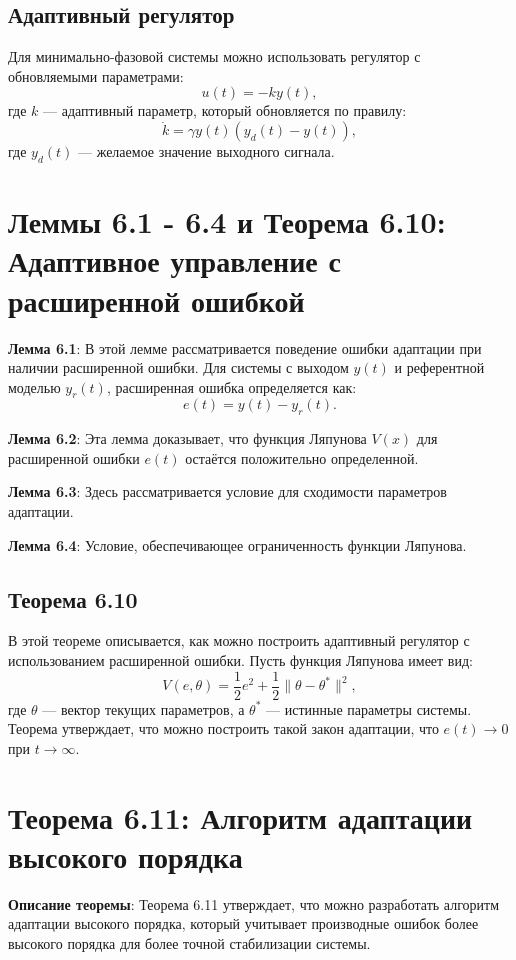 \documentclass[a4paper,14pt]{extarticle} %
\begin{document}
\subsection*{Адаптивный регулятор}
Для минимально-фазовой системы можно использовать регулятор с обновляемыми параметрами:
\[
u(t) = -k y(t),
\]
где \( k \) — адаптивный параметр, который обновляется по правилу:
\[
\dot{k} = \gamma y(t) \left( y_d(t) - y(t) \right),
\]
где \( y_d(t) \) — желаемое значение выходного сигнала.

\section{Леммы 6.1 - 6.4 и Теорема 6.10: Адаптивное управление с расширенной ошибкой}
\textbf{Лемма 6.1}: В этой лемме рассматривается поведение ошибки адаптации при наличии расширенной ошибки. Для системы с выходом \( y(t) \) и референтной моделью \( y_r(t) \), расширенная ошибка определяется как:
\[
e(t) = y(t) - y_r(t).
\]

\textbf{Лемма 6.2}: Эта лемма доказывает, что функция Ляпунова \( V(x) \) для расширенной ошибки \( e(t) \) остаётся положительно определенной.

\textbf{Лемма 6.3}: Здесь рассматривается условие для сходимости параметров адаптации.

\textbf{Лемма 6.4}: Условие, обеспечивающее ограниченность функции Ляпунова.

\subsection*{Теорема 6.10}
В этой теореме описывается, как можно построить адаптивный регулятор с использованием расширенной ошибки. Пусть функция Ляпунова имеет вид:
\[
V(e, \theta) = \frac{1}{2} e^2 + \frac{1}{2} \| \theta - \theta^* \|^2,
\]
где \( \theta \) — вектор текущих параметров, а \( \theta^* \) — истинные параметры системы. Теорема утверждает, что можно построить такой закон адаптации, что \( e(t) \to 0 \) при \( t \to \infty \).

\section{Теорема 6.11: Алгоритм адаптации высокого порядка}
\textbf{Описание теоремы}: Теорема 6.11 утверждает, что можно разработать алгоритм адаптации высокого порядка, который учитывает производные ошибок более высокого порядка для более точной стабилизации системы.
\end{document}
